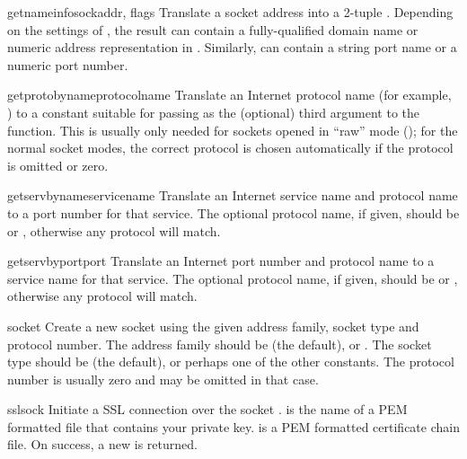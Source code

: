 \begin{funcdesc}{getnameinfo}{sockaddr, flags}
Translate a socket address  into a 2-tuple
.
Depending on the settings of , the result can contain a
fully-qualified domain name or numeric address representation in
.  Similarly,  can contain a string port name or a
numeric port number.
\end{funcdesc}

\begin{funcdesc}{getprotobyname}{protocolname}
Translate an Internet protocol name (for example, ) to a constant
suitable for passing as the (optional) third argument to the
 function.  This is usually only needed for sockets
opened in ``raw'' mode (); for the normal socket
modes, the correct protocol is chosen automatically if the protocol is
omitted or zero.
\end{funcdesc}

\begin{funcdesc}{getservbyname}{servicename}
Translate an Internet service name and protocol name to a port number
for that service.  The optional protocol name, if given, should be
 or , otherwise any protocol will match.
\end{funcdesc}

\begin{funcdesc}{getservbyport}{port}
Translate an Internet port number and protocol name to a service name
for that service.  The optional protocol name, if given, should be
 or , otherwise any protocol will match.
\end{funcdesc}

\begin{funcdesc}{socket}{}
Create a new socket using the given address family, socket type and
protocol number.  The address family should be  (the
default),  or .  The socket type
should be  (the default), 
or perhaps one of the other  constants.  The protocol
number is usually zero and may be omitted in that case.
\end{funcdesc}

\begin{funcdesc}{ssl}{sock}
Initiate a SSL connection over the socket .  is
the name of a PEM formatted file that contains your private
key.  is a PEM formatted certificate chain file. On
success, a new  is returned.

\end{funcdesc}

